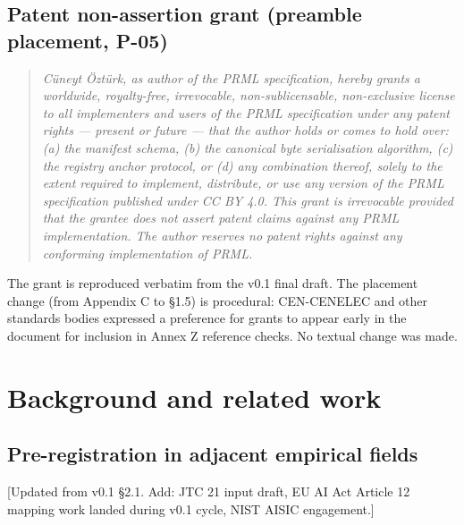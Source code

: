 \documentclass[11pt, a4paper]{article}
\begin{document}
\subsection{Patent non-assertion grant (preamble placement, P-05)}
\label{sec:patent-grant}

\begin{quote}
\itshape
Cüneyt Öztürk, as author of the PRML specification, hereby grants a worldwide, royalty-free, irrevocable, non-sublicensable, non-exclusive license to all implementers and users of the PRML specification under any patent rights --- present or future --- that the author holds or comes to hold over: (a) the manifest schema, (b) the canonical byte serialisation algorithm, (c) the registry anchor protocol, or (d) any combination thereof, solely to the extent required to implement, distribute, or use any version of the PRML specification published under CC BY 4.0. This grant is irrevocable provided that the grantee does not assert patent claims against any PRML implementation. The author reserves no patent rights against any conforming implementation of PRML.
\end{quote}

The grant is reproduced verbatim from the v0.1 final draft. The placement change (from Appendix C to §1.5) is procedural: CEN-CENELEC and other standards bodies expressed a preference for grants to appear early in the document for inclusion in Annex Z reference checks. No textual change was made.

\section{Background and related work}
\label{sec:background}


\subsection{Pre-registration in adjacent empirical fields}

[Updated from v0.1 §2.1. Add: JTC 21 input draft, EU AI Act Article 12 mapping work landed during v0.1 cycle, NIST AISIC engagement.]
\end{document}
